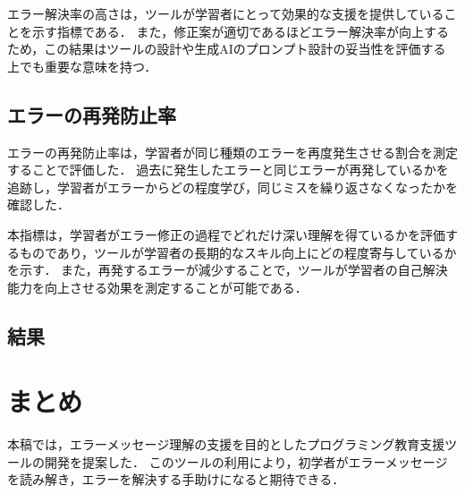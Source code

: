 \documentclass[12pt,twoside]{jbook}
\begin{document}
エラー解決率の高さは，ツールが学習者にとって効果的な支援を提供していることを示す指標である．
また，修正案が適切であるほどエラー解決率が向上するため，この結果はツールの設計や生成AIのプロンプト設計の妥当性を評価する上でも重要な意味を持つ．

\section{エラーの再発防止率}
エラーの再発防止率は，学習者が同じ種類のエラーを再度発生させる割合を測定することで評価した．
過去に発生したエラーと同じエラーが再発しているかを追跡し，学習者がエラーからどの程度学び，同じミスを繰り返さなくなったかを確認した．

本指標は，学習者がエラー修正の過程でどれだけ深い理解を得ているかを評価するものであり，ツールが学習者の長期的なスキル向上にどの程度寄与しているかを示す．
また，再発するエラーが減少することで，ツールが学習者の自己解決能力を向上させる効果を測定することが可能である．


\section{結果}

\chapter{まとめ}
本稿では，エラーメッセージ理解の支援を目的としたプログラミング教育支援ツールの開発を提案した．
このツールの利用により，初学者がエラーメッセージを読み解き，エラーを解決する手助けになると期待できる．


%
%




\appendix
\end{document}
